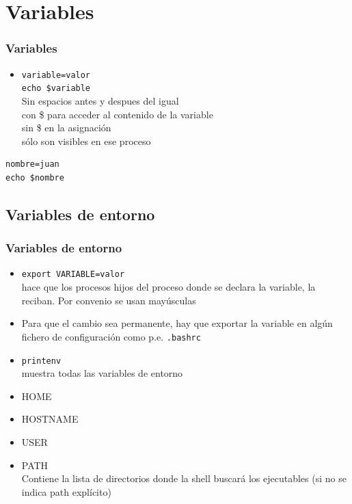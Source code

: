 \documentclass[ucs]{beamer}
\begin{document}
\section{Variables}

\begin{frame}[fragile]
\frametitle{Variables }
\begin{itemize} 
\item  \verb|variable=valor|\\
\verb|echo $variable| \\
Sin espacios antes y despues del igual\\
con \$ para acceder al contenido de la variable\\
sin \$ en la asignación\\
sólo son visibles en ese proceso
\end{itemize}
\begin{footnotesize}
\begin{verbatim}
nombre=juan 
echo $nombre
\end{verbatim}
\end{footnotesize}


\end{frame}
\begin{frame}[fragile]
\subsection{Variables de entorno}

\frametitle{Variables de entorno}
\begin{itemize} 
\item
\verb|export VARIABLE=valor|\\hace que los procesos hijos del proceso donde 
se declara la variable, la reciban. Por convenio se usan mayúsculas


\item
Para que el cambio sea permanente, hay que exportar la variable
en algún fichero de configuración como p.e.
\verb|.bashrc|


\item \verb|printenv| \\muestra todas las variables de entorno
\item 
HOME  
\item 
HOSTNAME 
\item 
USER 
\item PATH\\
Contiene la lista de directorios donde la shell buscará los
ejecutables (si no se indica path explícito)
\end{itemize}
\end{frame}
\end{document}
